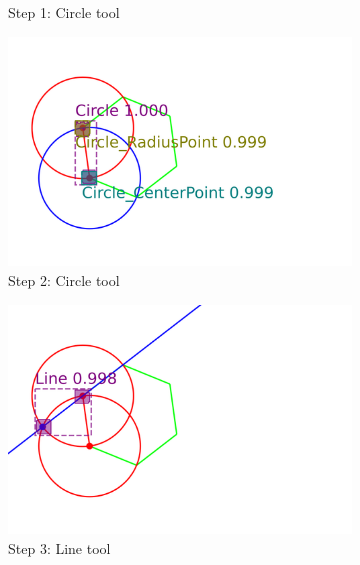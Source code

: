 \begin{figure}[!h]
\begin{subfigure}[t]{0.32\textwidth}
         \caption{Step 1: Circle tool}
         \label{fig:Epsilon12_example_step1}
     \end{subfigure}
     \hfill
     \begin{subfigure}[t]{0.32\textwidth}
         \centering
         \includegraphics[width=\textwidth]{img/Epsilon-12_example/output_image1.png}
         \caption{Step 2: Circle tool}
         \label{fig:Epsilon12_example_step2}
     \end{subfigure}
     \hfill
     \begin{subfigure}[t]{0.32\textwidth}
         \centering
         \includegraphics[width=\textwidth]{img/Epsilon-12_example/output_image2.png}
         \caption{Step 3: Line tool}
         \label{fig:Epsilon12_example_step3}
     \end{subfigure}
     \hfill
     \begin{subfigure}[t]{0.32\textwidth}

\end{subfigure}
\end{figure}
